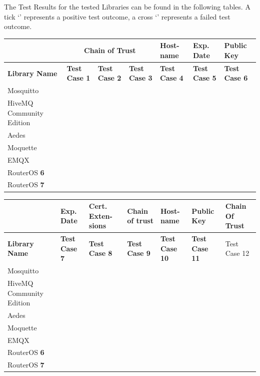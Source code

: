 \documentclass[binding=0.6cm,noexaminfo]{sapthesis}
\newcommand{\cmark}{\ding{51}}%
\newcommand{\xmark}{\ding{55}}%
\begin{document}
\newpage
The Test Results for the tested Libraries can be found in the following tables. A tick `\cmark' represents a positive test outcome, a cross `\xmark' represents a failed test outcome.

\begin{flushleft}
\begin{tabular}{| p{2cm} | p{1.5cm} | p{1.5cm} | p{1.5cm} | p{1.5cm} | p{1.5cm} | p{1.5cm} |}
\hline
 & \multicolumn{3}{|c|}{\bf Chain of Trust} & \bf Host- name & \bf Exp. Date & \bf Public Key \\
\hline
\bf Library Name & \bf Test Case 1 & \bf Test Case 2 & \bf Test Case 3 & \bf Test Case 4 & \bf Test Case 5 & \bf Test Case 6 \\
\hline
Mosquitto & \cmark & \cmark & \cmark & \cmark & \cmark & \cmark  \\
\hline
HiveMQ Community Edition & \cmark & \cmark & \cmark & \cmark & \cmark & \cmark  \\
\hline
Aedes & \cmark & \cmark & \cmark & \cmark & \cmark & \cmark  \\
\hline
Moquette & \cmark & \cmark & \cmark & \cmark & \cmark & \cmark  \\
\hline
EMQX & \cmark & \cmark & \cmark & \cmark & \cmark & \cmark  \\
\hline
RouterOS \textbf{6} & \cmark & \cmark & \cmark & \cmark & \cmark & \cmark  \\
\hline
RouterOS \textbf{7} & \cmark & \cmark & \cmark & \cmark & \cmark & \cmark  \\
\hline
\end{tabular}
\end{flushleft}

\begin{flushleft}
\begin{tabular}{| p{2cm} | p{1.5cm} | p{1.5cm} | p{1.5cm} | p{1.5cm} | p{1.5cm} | p{1.5cm} |}
\hline
 & \bf Exp. Date & \bf Cert. Exten- sions & \bf Chain of trust & \bf Host- name & \bf Public Key & \bf Chain Of Trust \\
\hline
\bf Library Name & \bf Test Case 7 & \bf Test Case 8 & \bf Test Case 9 & \bf Test Case 10 & \bf Test Case 11 & Test Case 12 \\
\hline
Mosquitto & \cmark & \cmark & \cmark & \cmark & \cmark & \cmark \\
\hline
HiveMQ Community Edition & \cmark & \cmark & \cmark & \cmark & \cmark  & \cmark \\
\hline
Aedes & \cmark & \cmark & \cmark & \cmark & \cmark  & \cmark \\
\hline
Moquette & \cmark & \cmark & \cmark & \cmark & \cmark  & \cmark \\
\hline
EMQX & \cmark & \cmark & \cmark & \cmark & \cmark  & \cmark \\
\hline
RouterOS \textbf{6} & \cmark & \cmark & \cmark & \cmark & \cmark  & \cmark \\
\hline
RouterOS \textbf{7} & \cmark & \xmark & \cmark & \cmark & \cmark  & \cmark \\
\hline
\end{tabular}
\end{flushleft}
\end{document}
